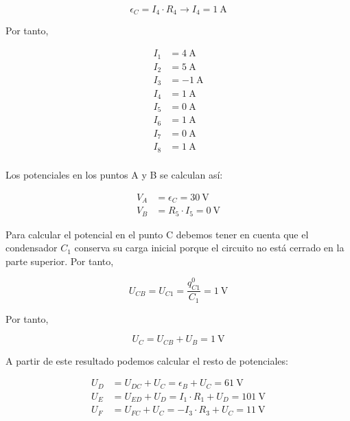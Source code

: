 \documentclass[10pt]{article}
\begin{document}
\begin{equation*}
  \epsilon_C = I_4 \cdot R_4 \rightarrow I_4 = \SI{1}{\ampere}
\end{equation*}

Por tanto,

\begin{align*}
  I_1 &= \SI{4}{\ampere}\\
  I_2 &= \SI{5}{\ampere}\\
  I_3 &= \SI{-1}{\ampere}\\
  I_4 &= \SI{1}{\ampere}\\
  I_5 &= \SI{0}{\ampere}\\
  I_6 &= \SI{1}{\ampere}\\
  I_7 &= \SI{0}{\ampere}\\
  I_8 &= \SI{1}{\ampere}\\
\end{align*}

Los potenciales en los puntos A y B se calculan así:

\begin{align*}
  V_A &= \epsilon_C = \SI{30}{\volt}\\
  V_B &= R_5 \cdot I_5 = \SI{0}{\volt}
\end{align*}

Para calcular el potencial en el punto C debemos tener en cuenta que el condensador $C_1$ conserva su carga inicial porque el circuito no está cerrado en la parte superior. Por tanto,

\begin{equation*}
  U_{CB} = U_{C1} = \frac{q^0_{C1} }{C_1} = \SI{1}{\volt}
\end{equation*}

Por tanto,

\begin{equation*}
  U_C = U_{CB} + U_B = \SI{1}{\volt}
\end{equation*}

A partir de este resultado podemos calcular el resto de potenciales:

\begin{align*}
  U_D &= U_{DC} + U_C = \epsilon_B + U_C = \SI{61}{\volt}\\
  U_E &= U_{ED} + U_D = I_1 \cdot R_1 + U_D = \SI{101}{\volt}\\
  U_F &= U_{FC} + U_C = -I_3 \cdot R_3 + U_C = \SI{11}{\volt}
\end{align*}

\clearpage

\section{}
\end{document}
